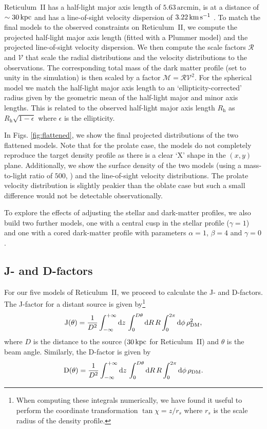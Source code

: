 \documentclass[prd,twocolumn,showpacs,preprintnumbers,superscriptaddress,nofootinbib,amsmath,amssymb,nobalancelastpage]{revtex4}
\def\kpc{\,{\rm kpc}}
\def\kms{\,{\rm km\,s^{-1}}}
\newcommand{\Df}{{\rm D}}
\newcommand{\Jf}{{\rm J}}
\begin{document}
Reticulum~II has a half-light major axis length of $5.63\,\mathrm{arcmin}$, is at
a distance of $\sim 30\kpc$ \citep{Ko15} and has a line-of-sight
velocity dispersion of $3.22\kms$ \citep{Ko15a}. To match the final
models to the observed constraints on Reticulum~II, we compute the
projected half-light major axis length (fitted with a Plummer model)
and the projected line-of-sight velocity dispersion. We then compute
the scale factors $\mathcal{R}$ and $\mathcal{V}$ that scale the
radial distributions and the velocity distributions to the
observations. The corresponding total mass of the dark matter profile
(set to unity in the simulation) is then scaled by a factor
$\mathcal{M}=\mathcal{R}\mathcal{V}^2$. For the spherical model we match the half-light major axis length to an `ellipticity-corrected' radius given by the geometric mean of the half-light major and minor axis lengths. This is related to the observed half-light major axis length $R_\mathrm{h}$ as $R_\mathrm{h}\sqrt{1-\epsilon}$ where $\epsilon$ is the ellipticity.

In Figs. \ref{fig:flattened}, we show the final projected
distributions of the two flattened models. Note that for the prolate
case, the models do not completely reproduce the target density profile
as there is a clear `X' shape in the $(x,y)$ plane. Additionally, we
show the surface density of the two models (using a mass-to-light
ratio of $500$, \cite{Ko15a}) and the line-of-sight velocity
distributions. The prolate velocity distribution is slightly peakier
than the oblate case but such a small difference would not be
detectable observationally.

To explore the effects of adjusting the stellar and dark-matter
profiles, we also build two further models, one with a central cusp in
the stellar profile ($\gamma=1$) and one with a cored dark-matter
profile with parameters $\alpha=1$, $\beta=4$ and $\gamma=0$.

\subsection{J- and D-factors}

For our five models of Reticulum~II, we proceed to calculate the J-
and D-factors. The J-factor for a distant source is given by\footnote{When computing these integrals numerically, we have found it useful to perform the coordinate transformation $\tan\chi = z/r_s$ where $r_s$ is the scale radius of the density profile.}
%
\begin{equation}
\Jf(\theta) = \frac{1}{D^2}\int_{-\infty}^{+\infty}\mathrm{d}z\,\int_0^{D\theta}\mathrm{d}R\,R\int_0^{2\pi}\mathrm{d}\phi\,\rho_\mathrm{DM}^2,
\end{equation}
%
where $D$ is the distance to the source ($30\kpc$ for Reticulum~II) and $\theta$ is the beam angle. Similarly, the D-factor is given by
%
\begin{equation}
\Df(\theta) = \frac{1}{D^2}\int_{-\infty}^{+\infty}\mathrm{d}z\,\int_0^{D\theta}\mathrm{d}R\,R\int_0^{2\pi}\mathrm{d}\phi\,\rho_\mathrm{DM}.
\end{equation}
\end{document}
